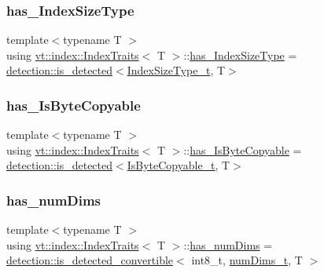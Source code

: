 \subsubsection{\texorpdfstring{has\+\_\+\+Index\+Size\+Type}{has\_IndexSizeType}}
{\footnotesize\ttfamily template$<$typename T $>$ \\
using \hyperlink{structvt_1_1index_1_1_index_traits}{vt\+::index\+::\+Index\+Traits}$<$ T $>$\+::\hyperlink{structvt_1_1index_1_1_index_traits_ad4433ee81a5b60b9d300efcec8b97181}{has\+\_\+\+Index\+Size\+Type} =  \hyperlink{namespacedetection_a30893549a3de1e9603d78dad6d5dce92}{detection\+::is\+\_\+detected}$<$\hyperlink{structvt_1_1index_1_1_index_traits_a583a777d70fc52ccfe1083acabc9640f}{Index\+Size\+Type\+\_\+t}, T$>$}

\mbox{\label{structvt_1_1index_1_1_index_traits_ab35645966fbb207e0e70982a610f1eb2}} 
\subsubsection{\texorpdfstring{has\+\_\+\+Is\+Byte\+Copyable}{has\_IsByteCopyable}}
{\footnotesize\ttfamily template$<$typename T $>$ \\
using \hyperlink{structvt_1_1index_1_1_index_traits}{vt\+::index\+::\+Index\+Traits}$<$ T $>$\+::\hyperlink{structvt_1_1index_1_1_index_traits_ab35645966fbb207e0e70982a610f1eb2}{has\+\_\+\+Is\+Byte\+Copyable} =  \hyperlink{namespacedetection_a30893549a3de1e9603d78dad6d5dce92}{detection\+::is\+\_\+detected}$<$\hyperlink{structvt_1_1index_1_1_index_traits_a6869472628098b68d1ce678422814734}{Is\+Byte\+Copyable\+\_\+t}, T$>$}

\mbox{\label{structvt_1_1index_1_1_index_traits_aa063bfa4f5eec4fea36c7ee151519ceb}} 
\subsubsection{\texorpdfstring{has\+\_\+num\+Dims}{has\_numDims}}
{\footnotesize\ttfamily template$<$typename T $>$ \\
using \hyperlink{structvt_1_1index_1_1_index_traits}{vt\+::index\+::\+Index\+Traits}$<$ T $>$\+::\hyperlink{structvt_1_1index_1_1_index_traits_aa063bfa4f5eec4fea36c7ee151519ceb}{has\+\_\+num\+Dims} =  \hyperlink{namespacedetection_afb970b23e39cfecb33449d40242c49ff}{detection\+::is\+\_\+detected\+\_\+convertible}$<$ int8\+\_\+t, \hyperlink{structvt_1_1index_1_1_index_traits_a9c055598424a66789ec9a5986c2ace3a}{num\+Dims\+\_\+t}, T $>$}

